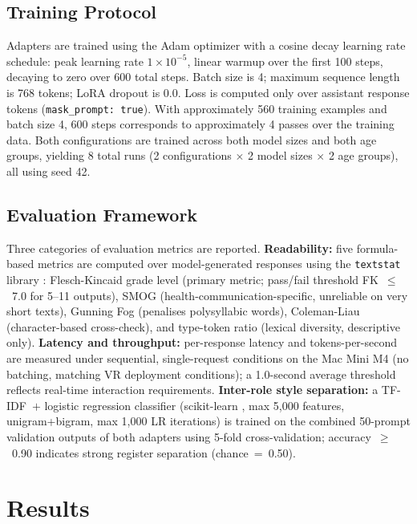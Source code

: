 \documentclass[ASNA,twocolumn]{USG} %
\begin{document}
\subsection{Training Protocol}

Adapters are trained using the Adam optimizer with a cosine decay learning rate schedule: peak learning rate $1 \times 10^{-5}$, linear warmup over the first 100 steps, decaying to zero over 600 total steps. Batch size is 4; maximum sequence length is 768 tokens; LoRA dropout is 0.0. Loss is computed only over assistant response tokens (\texttt{mask\_prompt: true}). With approximately 560 training examples and batch size 4, 600 steps corresponds to approximately 4 passes over the training data. Both configurations are trained across both model sizes and both age groups, yielding 8 total runs (2 configurations $\times$ 2 model sizes $\times$ 2 age groups), all using seed 42.

\subsection{Evaluation Framework}

Three categories of evaluation metrics are reported. \textbf{Readability:} five formula-based metrics are computed over model-generated responses using the \texttt{textstat} library \cite{bansal2023textstat}: Flesch-Kincaid grade level \cite{kincaid1975fk} (primary metric; pass/fail threshold FK~$\leq$~7.0 for 5--11 outputs), SMOG \cite{mclaughlin1969smog} (health-communication-specific, unreliable on very short texts), Gunning Fog \cite{gunning1952fog} (penalises polysyllabic words), Coleman-Liau \cite{coleman1975cli} (character-based cross-check), and type-token ratio (lexical diversity, descriptive only). \textbf{Latency and throughput:} per-response latency and tokens-per-second are measured under sequential, single-request conditions on the Mac Mini M4 (no batching, matching VR deployment conditions); a 1.0-second average threshold reflects real-time interaction requirements. \textbf{Inter-role style separation:} a TF-IDF~$+$ logistic regression classifier (scikit-learn \cite{pedregosa2011sklearn}, max 5{,}000 features, unigram+bigram, max 1{,}000 LR iterations) is trained on the combined 50-prompt validation outputs of both adapters using 5-fold cross-validation; accuracy~$\geq$~0.90 indicates strong register separation (chance~=~0.50).

\section{Results}\label{sec5}
\end{document}
